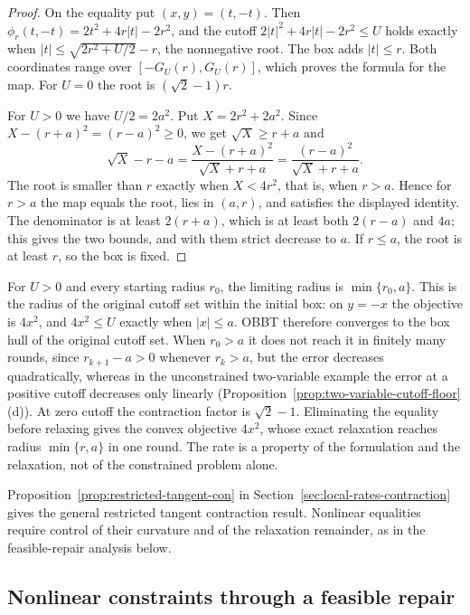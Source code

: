 \begin{proof}
On the equality put $(x,y)=(t,-t)$. Then
$\phi_r(t,-t)=2t^2+4r|t|-2r^2$, and the cutoff
$2|t|^2+4r|t|-2r^2\le U$ holds exactly when
$|t|\le\sqrt{2r^2+U/2}-r$, the nonnegative root. The box adds $|t|\le r$.
Both coordinates range over $[-G_U(r),G_U(r)]$, which proves the formula
for the map. For $U=0$ the root is $(\sqrt2-1)r$.

For $U>0$ we have $U/2=2a^2$. Put $X=2r^2+2a^2$. Since
$X-(r+a)^2=(r-a)^2\ge0$, we get $\sqrt X\ge r+a$ and
\[
 \sqrt X-r-a=\frac{X-(r+a)^2}{\sqrt X+r+a}=\frac{(r-a)^2}{\sqrt X+r+a}.
\]
The root is smaller than $r$ exactly when $X<4r^2$, that is, when $r>a$.
Hence for $r>a$ the map equals the root, lies in $(a,r)$, and satisfies
the displayed identity. The denominator is at least $2(r+a)$, which is at
least both $2(r-a)$ and $4a$; this gives the two bounds, and with them
strict decrease to $a$. If $r\le a$, the root is at least $r$, so the box
is fixed.
\end{proof}

For $U>0$ and every starting radius $r_0$, the limiting radius is
$\min\{r_0,a\}$. This is the radius of the original cutoff set within the
initial box: on $y=-x$ the objective is $4x^2$, and $4x^2\le U$ exactly
when $|x|\le a$. OBBT therefore converges to the box hull of the original
cutoff set. When $r_0>a$ it does not reach it in finitely many rounds, since
$r_{k+1}-a>0$ whenever $r_k>a$, but the error decreases quadratically,
whereas in the unconstrained
two-variable example the error at a positive cutoff decreases only
linearly (Proposition~\ref{prop:two-variable-cutoff-floor}(d)). At zero cutoff the
contraction factor is $\sqrt2-1$. Eliminating the equality before relaxing
gives the convex objective $4x^2$, whose exact relaxation reaches radius
$\min\{r,a\}$ in one round. The rate is a property of the formulation and
the relaxation, not of the constrained problem alone.

Proposition~\ref{prop:restricted-tangent-con} in
Section~\ref{sec:local-rates-contraction} gives the general restricted tangent
contraction result. Nonlinear equalities require control of their curvature
and of the relaxation remainder, as in the feasible-repair analysis below.

\subsection{Nonlinear constraints through a feasible repair}\label{sec:repair-con}

